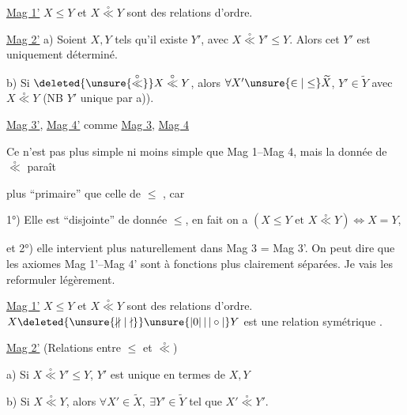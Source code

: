 \uline{Mag 1'} $X\leq Y$ et $X\overset{\circ}{\ll}Y$ sont des relations d'ordre.

\uline{Mag 2'} a) Soient $X,Y$ tels qu'il existe $Y'$, avec $X\overset{\circ}{\ll}Y'\leq Y$. Alors cet $Y'$ est uniquement déterminé.

 b) Si $\deleted{\unsure{\overset{\circ}{\ll}}}X\overset{\circ}{\ll}Y$, alors $\forall X'\unsure{\in|\leq}\widetilde X$,  $Y'\in\widetilde Y$ avec $X\overset{\circ}{\ll}Y$ (NB $Y'$ unique par a)).

\uline{Mag 3'}, \uline{Mag 4'} comme \uline{Mag 3}, \uline{Mag 4}

Ce n'est pas plus simple ni moins simple que Mag 1--Mag 4, mais la donnée de $\overset{\circ}{\ll}$ paraît


plus ``primaire'' que celle de $\leq$ , car

1°) Elle est ``disjointe'' de  donnée $\leq$, en fait on a $(X\leq Y\text{ et }X\overset{\circ}{\ll}Y)\Longleftrightarrow X=Y$, 

et 2°) elle intervient plus naturellement dans Mag 3 = Mag 3'. On peut dire   que les axiomes  Mag 1'--Mag 4' sont à fonctions plus clairement séparées. Je vais les reformuler légèrement.

\uline{Mag 1'}  $X\leq Y$ et $X\overset{\circ}{\ll}Y$ sont des relations d'ordre. $X\deleted{\unsure{\nparallel|\nmid}}\unsure{|0|\,|\,|\circ|}Y$ est une relation symétrique .

\uline{Mag 2'} (Relations entre $\leq$ et $\overset{\circ}{\ll}$)

 a) Si $X\overset{\circ}{\ll}Y'\leq Y$, $Y'$ est unique en termes de $X,Y$

 b) Si $X\overset{\circ}{\ll}Y$, alors $\forall X'\in\widetilde X,\ \exists Y'\in\widetilde Y$ tel que $X'\overset{\circ}{\ll}Y'$.


